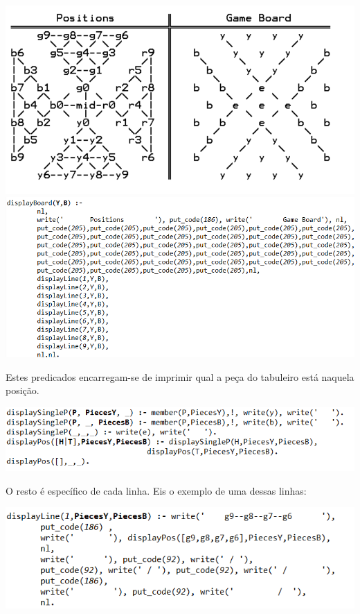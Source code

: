 \documentclass[a4paper]{article}
\begin{document}
\includegraphics[scale=0.6]{gameBoard.png}\linebreak\linebreak
\includegraphics[scale=0.6]{displayBoard.png}\linebreak\linebreak

Estes predicados encarregam-se de imprimir qual a peça do tabuleiro está naquela posição. 

\includegraphics[scale=0.8]{displayBoard1.png}\linebreak\linebreak

O resto é específico de cada linha. Eis o exemplo de uma dessas linhas: 

\includegraphics[scale=0.8]{displayBoard2.png}\linebreak\linebreak
\end{document}
